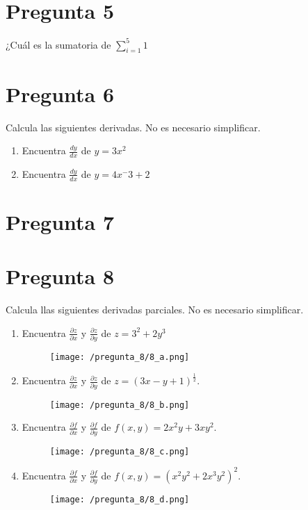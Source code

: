 \documentclass[]{article}
\begin{document}
\section*{Pregunta 5}
¿Cuál es la sumatoria de $\sum_{i=1}^{5}1$
\section*{Pregunta 6}
Calcula las siguientes derivadas. No es necesario simplificar.

\begin{enumerate}[label=(\alph*)]
	\item Encuentra $\frac{dy}{dx}$ de $y=3x^2$
	\item Encuentra $\frac{dy}{dx}$ de $y=4x^-3+2$
\end{enumerate}



\section*{Pregunta 7}
\newpage
\section*{Pregunta 8}
Calcula llas siguientes derivadas parciales. No es necesario simplificar.

\begin{enumerate}[label=(\alph*)]
	\item Encuentra $\frac{\partial z}{\partial x}$ y $\frac{\partial z}{\partial y}$ de $z=3^2+2y^3$
	\begin{figure}[H]
		\texttt{[image: /pregunta\_8/8\_a.png]}
	\end{figure}
	\item Encuentra $\frac{\partial z}{\partial x}$ y $\frac{\partial z}{\partial y}$ de $z=(3x-y+1)^\frac{1}{2}$.
	\begin{figure}[H]
		\texttt{[image: /pregunta\_8/8\_b.png]}
	\end{figure}
	\item Encuentra $\frac{\partial f}{\partial x}$ y $\frac{\partial f}{\partial y}$ de $f(x,y)=2x^2y+3xy^2$.
	\begin{figure}[H]
		\texttt{[image: /pregunta\_8/8\_c.png]}
	\end{figure}
	\item Encuentra $\frac{\partial f}{\partial x}$ y $\frac{\partial f}{\partial y}$ de $f(x,y)=(x^2y^2+2x^3y^2)^2$.
	\begin{figure}[H]
		\texttt{[image: /pregunta\_8/8\_d.png]}
	\end{figure}
\end{enumerate}
\end{document}
